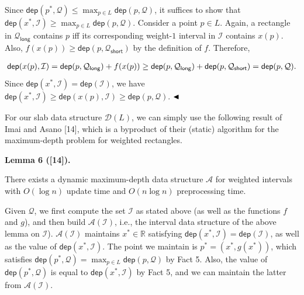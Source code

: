 \documentclass[10pt,a4paper]{article}
\begin{document}
\par
Since $\mathsf{dep}(p^{*},\mathcal{Q})\leq\max_{p\in L}{\mathsf{dep}}(p,\mathcal{Q})$, it suffices to show that $\mathsf{dep}(x^{*},\mathcal{I})\geq\max_{p\in L}{\mathsf{dep}}(p,\mathcal{Q})$. Consider a point $p\in L$. Again, a rectangle in $\mathcal{Q}_{\mathsf{long}}$ contains $p$ iff its corresponding weight-$1$ interval in $\mathcal{I}$ contains $x(p)$. Also, $f(x(p))\geq\mathsf{dep}(p,\mathcal{Q}_{\mathsf{short}})$ by the definition of $f$. Therefore,
\par
\[\begin{aligned}
{\mathsf{dep}}(x(p),\mathcal{I})=\mathsf{dep}(p,\mathcal{Q}_{\mathsf{long}})+f%
(x(p))\geq\mathsf{dep}(p,\mathcal{Q}_{\mathsf{long}})+\mathsf{dep}(p,\mathcal{%
Q}_{\mathsf{short}})=\mathsf{dep}(p,\mathcal{Q}).
\end{aligned}\]
Since $\mathsf{dep}(x^{*},\mathcal{I})=\mathsf{dep}(\mathcal{I})$, we have $\mathsf{dep}(x^{*},\mathcal{I})\geq{\mathsf{dep}}(x(p),\mathcal{I})\geq\mathsf%
{dep}(p,\mathcal{Q})$. $\hfill\blacktriangleleft$
\par
\par
For our slab data structure $\mathcal{D}(L)$, we can simply use the following result of Imai and Asano [14], which is a byproduct of their (static) algorithm for the maximum-depth problem for weighted rectangles.
\par
\par
\par\medskip\noindent\textbf{Lemma 6 ([14]).}\par
There exists a dynamic maximum-depth data structure $\mathcal{A}$ for weighted intervals with $O(\log n)$ update time and $O(n\log n)$ preprocessing time.
\par
\par
\par
Given $\mathcal{Q}$, we first compute the set $\mathcal{I}$ as stated above (as well as the functions $f$ and $g$), and then build $\mathcal{A}(\mathcal{I})$, i.e., the interval data structure of the above lemma on $\mathcal{I}$). $\mathcal{A}(\mathcal{I})$ maintains $x^{*}\in\mathbb{R}$ satisfying $\mathsf{dep}(x^{*},\mathcal{I})=\mathsf{dep}(\mathcal{I})$, as well as the value of $\mathsf{dep}(x^{*},\mathcal{I})$. The point we maintain is $p^{*}=(x^{*},g(x^{*}))$, which satisfies $\mathsf{dep}(p^{*},\mathcal{Q})=\max_{p\in L}{\mathsf{dep}}(p,\mathcal{Q})$ by Fact 5. Also, the value of $\mathsf{dep}(p^{*},\mathcal{Q})$ is equal to $\mathsf{dep}(x^{*},\mathcal{I})$ by Fact 5, and we can maintain the latter from $\mathcal{A}(\mathcal{I})$.
\end{document}
